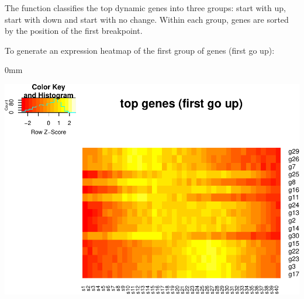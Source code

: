 \documentclass{article}
\begin{document}
The  function classifies the top dynamic genes into
three groups: start with up, start with down and start with no change.
Within each group, genes are sorted by the position of the first breakpoint.


To generate an expression heatmap of the first group of genes (first go up):

\begin{knitrout}
\color{fgcolor}\begin{kframe}
\begin{alltt}
\hlstd{(TrendyExampleData[}\hlopt{$}\hlstd{firstup),],}
  \hlstd{=}\hlstd{,} \hlstd{=}\hlstd{,}\hlstd{=}\hlstd{,}
        \hlstd{=}\hlstd{,} \hlstd{=}\hlstd{)}
\end{alltt}
\end{kframe}\begin{adjustwidth}{\fltoffset}{0mm}

{\centering \includegraphics[width=.8\textwidth]{figure/unnamed-chunk-7-1} 

}

\end{adjustwidth}
\end{knitrout}
\end{document}
